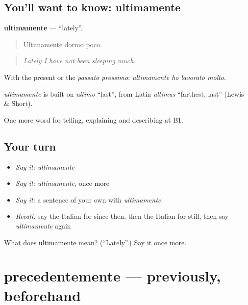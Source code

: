 \subsection*{You'll want to know: ultimamente}
\textbf{ultimamente} — \textquotedblleft{}lately\textquotedblright{}.

\begin{quote}
Ultimamente dormo poco.
\end{quote}

\begin{quote}
\emph{Lately I have not been sleeping much.}
\end{quote}

With the present or the \emph{passato prossimo}: \emph{ultimamente ho lavorato molto}.

\begin{cousinweb}
\emph{ultimamente} is built on \emph{ultimo} \textquotedblleft{}last\textquotedblright{}, from Latin \emph{ultimus} \textquotedblleft{}farthest, last\textquotedblright{} (Lewis \& Short).
\end{cousinweb}

\begin{grammarlens}[title={What you've built}]
One more word for telling, explaining and describing at B1.
\end{grammarlens}

\subsection*{Your turn}
\begin{itemize}
\raggedright
  \item \emph{Say it:} \emph{ultimamente}
  \item \emph{Say it:} \emph{ultimamente}, once more
  \item \emph{Say it:} a sentence of your own with \emph{ultimamente}
  \item \emph{Recall:} say the Italian for since then, then the Italian for still, then say \emph{ultimamente} again
\end{itemize}

\begin{tcolorbox}[breakable,colback=teal!4,colframe=teal!35!black,title={Before you move on}]
What does ultimamente mean? (\textquotedblleft{}Lately\textquotedblright{}.) Say it once more.
\end{tcolorbox}
\section[precedentemente]{precedentemente — previously, beforehand}

